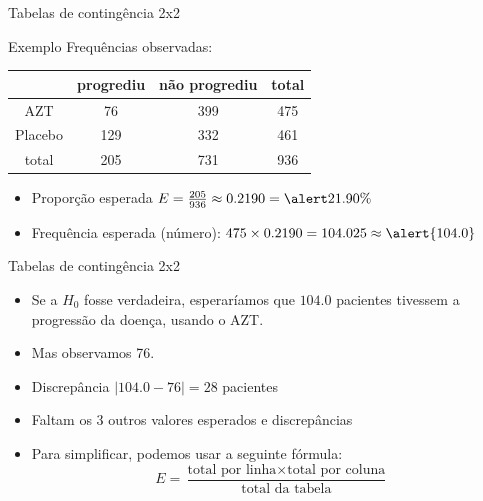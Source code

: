\documentclass{beamer}
\begin{document}
\begin{frame}{\scriptsize Tabelas de contingência 2x2}
  \begin{exampleblock}{Exemplo}
    \footnotesize
    Frequências observadas:
    \begin{tabular}{c|c|c|c}
      & progrediu & não progrediu & total\\
      \hline
      AZT & 76 & 399 & 475\\
      \hline
      Placebo & 129 & 332 & 461\\
      \hline
      total & \alert{205} & 731 & \alert{936}\\
    \end{tabular}
  \end{exampleblock}
  \vfill
  \begin{itemize}
    \footnotesize
  \item Proporção esperada $E = \frac{205}{936} \approx 0.2190 = \alert{21.90\%}$
  \item Frequência esperada (número): $475 \times 0.2190 = 104.025 \approx \alert{104.0}$
  \end{itemize}
\end{frame}

\begin{frame}{\scriptsize Tabelas de contingência 2x2}
  \begin{itemize}
    \small
  \item Se a $H_0$ fosse verdadeira, esperaríamos que $104.0$
    pacientes tivessem a progressão da doença, usando o AZT.
    \bigskip
  \item Mas observamos 76.
  \item Discrepância $|104.0 - 76| = 28$ pacientes
    \bigskip
    \bigskip
    \footnotesize
  \item Faltam os 3 outros valores esperados e discrepâncias
    \bigskip
    \bigskip
  \item Para simplificar, podemos usar a seguinte fórmula:
  \begin{displaymath}
    E = \frac{ \text{total por linha} \times \text{total por coluna}
    }{ \text{total da tabela} }
  \end{displaymath}
  \end{itemize}
\end{frame}
\end{document}
